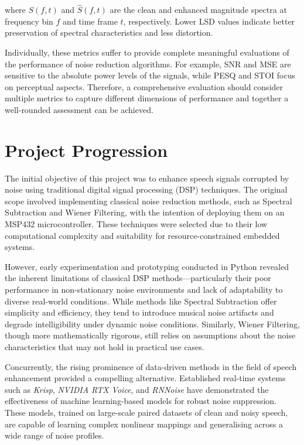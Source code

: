 where \( S(f, t) \) and \( \hat{S}(f, t) \) are the clean and enhanced magnitude spectra at frequency bin \( f \) and time frame \( t \), respectively. Lower LSD values indicate better preservation of spectral characteristics and less distortion.

\vspace{1em}
Individually, these metrics suffer to provide complete meaningful evaluations of the performance of noise reduction algorithms. For example, SNR and MSE are sensitive to the absolute power levels of the signals, while PESQ and STOI focus on perceptual aspects. Therefore, a comprehensive evaluation should consider multiple metrics to capture different dimensions of performance and together a well-rounded assessment can be achieved.


\section{Project Progression}
\label{sec:project_progression}

The initial objective of this project was to enhance speech signals corrupted by noise using traditional digital signal processing (DSP) techniques. The original scope involved implementing classical noise reduction methods, such as Spectral Subtraction and Wiener Filtering, with the intention of deploying them on an MSP432 microcontroller. These techniques were selected due to their low computational complexity and suitability for resource-constrained embedded systems.

However, early experimentation and prototyping conducted in Python revealed the inherent limitations of classical DSP methods—particularly their poor performance in non-stationary noise environments and lack of adaptability to diverse real-world conditions. While methods like Spectral Subtraction offer simplicity and efficiency, they tend to introduce musical noise artifacts and degrade intelligibility under dynamic noise conditions. Similarly, Wiener Filtering, though more mathematically rigorous, still relies on assumptions about the noise characteristics that may not hold in practical use cases.

Concurrently, the rising prominence of data-driven methods in the field of speech enhancement provided a compelling alternative. Established real-time systems such as \textit{Krisp}, \textit{NVIDIA RTX Voice}, and \textit{RNNoise} have demonstrated the effectiveness of machine learning-based models for robust noise suppression. These models, trained on large-scale paired datasets of clean and noisy speech, are capable of learning complex nonlinear mappings and generalising across a wide range of noise profiles.

